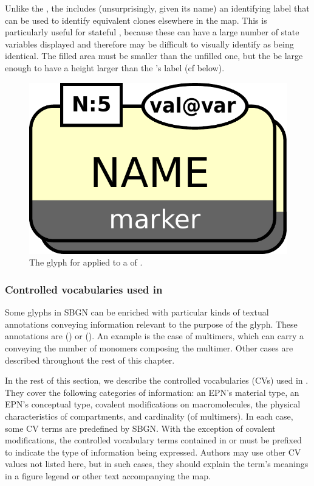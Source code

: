 Unlike the , the  includes (unsurprisingly, given its name) an identifying label that can be used to identify equivalent clones elsewhere in the map.  This is particularly useful for stateful , because these can have a large number of state variables displayed and therefore may be difficult to visually identify as being identical. The filled area must be smaller than the unfilled one, but the be large enough to have a height larger than the 's label (cf below).

\begin{figure}[htb]
  \centering
  \includegraphics[scale = 0.3]{le_images/labeledCloneMarker}
  \caption{The \PD glyph for  applied to a  of  .}
  \label{fig:labeledCloneMarker}
\end{figure}


\subsubsection{Controlled vocabularies used in \SBGNPDLone}\label{sec:CVs}

Some glyphs in SBGN \PDs can be enriched with particular kinds of textual annotations conveying information relevant to the purpose of the glyph.  These annotations are  () or   ().  An example is the case of multimers, which can carry a  conveying the number of monomers composing the multimer.  Other cases are described throughout the rest of this chapter.

In the rest of this section, we describe the controlled vocabularies (CVs) used in \SBGNPDLone.  They cover the following categories of information: an EPN's material type, an EPN's conceptual type, covalent modifications on macromolecules, the physical characteristics of compartments, and cardinality (\eg of multimers).  In each case, some CV terms are predefined by SBGN. With the exception of covalent modifications, the controlled vocabulary terms contained in  or  must be prefixed to indicate the type of information being expressed.  Authors may use other CV values not listed here, but in such cases, they should explain the term's meanings in a figure legend or other text accompanying the map.

